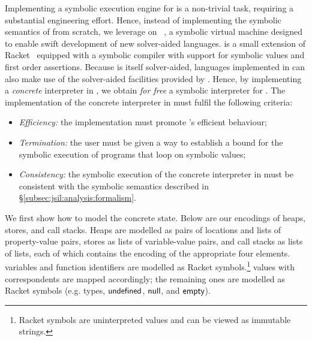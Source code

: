 Implementing a symbolic execution engine for \jsil is a non-trivial 
task, requiring a substantial engineering effort. 
% 
% 
Hence, instead of implementing the symbolic semantics of \jsil from scratch, we leverage on 
\rosette~\cite{Rosette1,Rosette2}, a symbolic virtual machine designed to 
enable swift development of new 
solver-aided languages. 
%
\rosette is a small extension of Racket~\cite{racket} equipped with a symbolic compiler with support 
for symbolic values and first order assertions. Because \rosette is itself solver-aided, languages 
implemented in \rosette can also make use of the solver-aided facilities provided by \rosette. 
Hence, by implementing a \emph{concrete} \jsil interpreter in \rosette, we obtain \emph{for free} a symbolic 
interpreter for \jsil. %
%
The implementation of the concrete interpreter in \rosette must fulfil the following criteria:
\begin{itemize}          
   \item \emph{Efficiency:} the implementation must promote \rosette's efficient behaviour;
   
   \item \emph{Termination:} the user must be given a way to establish a bound for the symbolic execution 
            of programs that loop on symbolic values; 
  
   \item \emph{Consistency:} the symbolic execution of the concrete interpreter in \rosette 
            must be consistent with the symbolic semantics described in \S\ref{subsec:jsil:analysis:formalism}. 
\end{itemize}


We first show
how to model the concrete \jsil state. Below are our \rosette encodings of \jsil heaps, stores, 
and call stacks. 
Heaps are modelled as pairs of locations and lists of property-value pairs, 
stores as lists of variable-value pairs, and call stacks as lists of lists, each of which
contains the \rosette encoding of the appropriate four elements. 
\jsil variables and function identifiers are modelled 
as Racket symbols.\footnote{Racket symbols are uninterpreted values and can be viewed as immutable strings.} 
\jsil values with \rosette correspondents are mapped accordingly; the remaining 
ones are modelled as Racket symbols (e.g. \jsil types, ${{\sf undefined}}$, ${\sf null}$, and ${\sf empty}$). 

